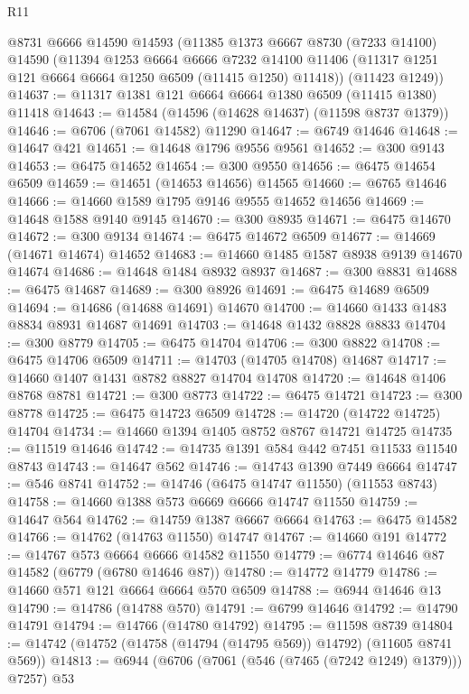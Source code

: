 \begin{lexlean}{R11}
\begin{coremodule}
    @8731
    @6666
    @14590
    @14593
    (@11385
      @1373
      @6667
      @8730
      (@7233 @14100)
      @14590
      (@11394
        @1253
        @6664
        @6666
        @7232
        @14100
        @11406
        (@11317 @1251 @121 @6664 @6664 @1250 @6509 (@11415 @1250) @11418))
      (@11423 @1249))
@14637 := @11317 @1381 @121 @6664 @6664 @1380 @6509 (@11415 @1380) @11418
@14643 := @14584 (@14596 (@14628 @14637) (@11598 @8737 @1379))
@14646 := @6706 (@7061 @14582) @11290
@14647 := @6749 @14646
@14648 := @14647 @421
@14651 := @14648 @1796 @9556 @9561
@14652 := @300 @9143
@14653 := @6475 @14652
@14654 := @300 @9550
@14656 := @6475 @14654 @6509
@14659 := @14651 (@14653 @14656) @14565
@14660 := @6765 @14646
@14666 := @14660 @1589 @1795 @9146 @9555 @14652 @14656
@14669 := @14648 @1588 @9140 @9145
@14670 := @300 @8935
@14671 := @6475 @14670
@14672 := @300 @9134
@14674 := @6475 @14672 @6509
@14677 := @14669 (@14671 @14674) @14652
@14683 := @14660 @1485 @1587 @8938 @9139 @14670 @14674
@14686 := @14648 @1484 @8932 @8937
@14687 := @300 @8831
@14688 := @6475 @14687
@14689 := @300 @8926
@14691 := @6475 @14689 @6509
@14694 := @14686 (@14688 @14691) @14670
@14700 := @14660 @1433 @1483 @8834 @8931 @14687 @14691
@14703 := @14648 @1432 @8828 @8833
@14704 := @300 @8779
@14705 := @6475 @14704
@14706 := @300 @8822
@14708 := @6475 @14706 @6509
@14711 := @14703 (@14705 @14708) @14687
@14717 := @14660 @1407 @1431 @8782 @8827 @14704 @14708
@14720 := @14648 @1406 @8768 @8781
@14721 := @300 @8773
@14722 := @6475 @14721
@14723 := @300 @8778
@14725 := @6475 @14723 @6509
@14728 := @14720 (@14722 @14725) @14704
@14734 := @14660 @1394 @1405 @8752 @8767 @14721 @14725
@14735 := @11519 @14646
@14742 := @14735 @1391 @584 @442 @7451 @11533 @11540 @8743
@14743 := @14647 @562
@14746 := @14743 @1390 @7449 @6664
@14747 := @546 @8741
@14752 := @14746 (@6475 @14747 @11550) (@11553 @8743)
@14758 := @14660 @1388 @573 @6669 @6666 @14747 @11550
@14759 := @14647 @564
@14762 := @14759 @1387 @6667 @6664
@14763 := @6475 @14582
@14766 := @14762 (@14763 @11550) @14747
@14767 := @14660 @191
@14772 := @14767 @573 @6664 @6666 @14582 @11550
@14779 := @6774 @14646 @87 @14582 (@6779 (@6780 @14646 @87))
@14780 := @14772 @14779
@14786 := @14660 @571 @121 @6664 @6664 @570 @6509
@14788 := @6944 @14646 @13
@14790 := @14786 (@14788 @570)
@14791 := @6799 @14646
@14792 := @14790 @14791
@14794 := @14766 (@14780 @14792)
@14795 := @11598 @8739
@14804 := @14742 (@14752 (@14758 (@14794 (@14795 @569)) @14792) (@11605 @8741 @569))
@14813 := @6944 (@6706 (@7061 (@546 (@7465 (@7242 @1249) @1379))) @7257) @53

\end{coremodule}
\end{lexlean}
